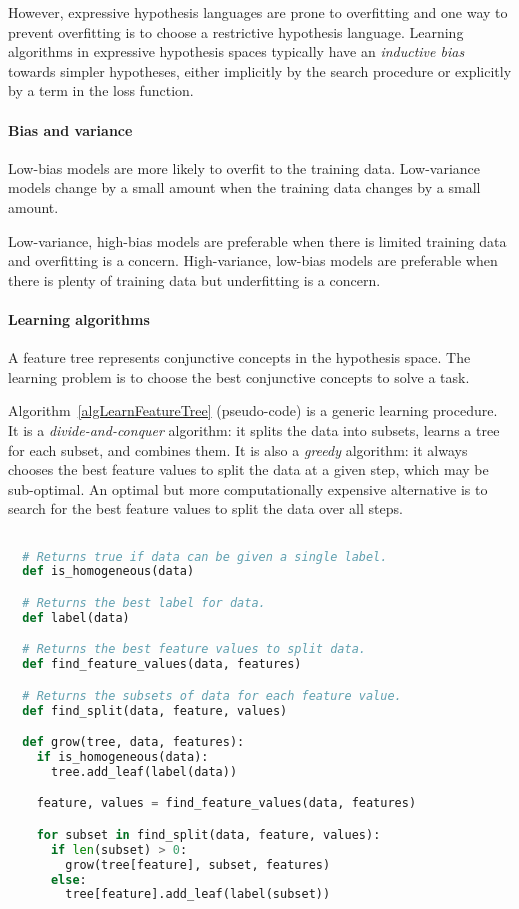 However, expressive hypothesis languages are prone to overfitting and one way to prevent overfitting is to choose a restrictive hypothesis language.
Learning algorithms in expressive hypothesis spaces typically have an \textit{inductive bias} towards simpler hypotheses, either implicitly by the search procedure or explicitly by a term in the loss function.

\paragraph{Bias and variance}

Low-bias models are more likely to overfit to the training data.
Low-variance models change by a small amount when the training data changes by a
small amount.

Low-variance, high-bias models are preferable when there is limited training
data and overfitting is a concern.
High-variance, low-bias models are preferable when there is plenty of training
data but underfitting is a concern.

\paragraph{Learning algorithms}

A feature tree represents conjunctive concepts in the hypothesis space.
The learning problem is to choose the best conjunctive concepts to solve a task.

Algorithm~\ref{algLearnFeatureTree} (pseudo-code) is a generic learning procedure.
It is a \textit{divide-and-conquer} algorithm: it splits the data into subsets, learns a tree for each subset, and combines them.
It is also a \textit{greedy} algorithm: it always chooses the best feature values to split the data at a given step, which may be sub-optimal.
An optimal but more computationally expensive alternative is to search for the best feature values to split the data over all steps.

\begin{alg}
  \label{algLearnFeatureTree}
  \begin{lstlisting}[language=Python]

  # Returns true if data can be given a single label.
  def is_homogeneous(data)

  # Returns the best label for data.
  def label(data)

  # Returns the best feature values to split data.
  def find_feature_values(data, features)

  # Returns the subsets of data for each feature value.
  def find_split(data, feature, values)

  def grow(tree, data, features):
    if is_homogeneous(data):
      tree.add_leaf(label(data))

    feature, values = find_feature_values(data, features)

    for subset in find_split(data, feature, values):
      if len(subset) > 0:
        grow(tree[feature], subset, features)
      else:
        tree[feature].add_leaf(label(subset))
\end{lstlisting}
\end{alg}


